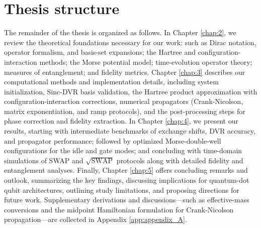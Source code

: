 \documentclass{subfiles}
\begin{document}
\section{Thesis structure}
The remainder of the thesis is organized as follows. In Chapter \ref{chap:2}, we review the theoretical foundations necessary for our work: such as Dirac notation, operator formalism, and basis-set expansions; the Hartree and configuration-interaction methods; the Morse potential model; time-evolution operator theory; measures of entanglement; and fidelity metrics. Chapter \ref{chap:3} describes our computational methods and implementation details, including system initialization, Sinc-DVR basis validation, the Hartree product approximation with configuration-interaction corrections, numerical propagators (Crank-Nicolson, matrix exponentiation, and ramp protocols), and the post-processing steps for phase correction and fidelity extraction. In Chapter \ref{chap:4}, we present our results, starting with intermediate benchmarks of exchange shifts, DVR accuracy, and propagator performance; followed by optimized Morse-double-well configurations for the idle and gate modes; and concluding with time-domain simulations of SWAP and $\sqrt{\mathrm{SWAP}}$ protocols along with detailed fidelity and entanglement analyses. Finally, Chapter \ref{chap:5} offers concluding remarks and outlook, summarizing the key findings, discussing implications for quantum-dot qubit architectures, outlining study limitations, and proposing directions for future work. Supplementary derivations and discussions—such as effective-mass conversions and the midpoint Hamiltonian formulation for Crank-Nicolson propagation—are collected in Appendix \ref{app:appendix_A}.
\end{document}
